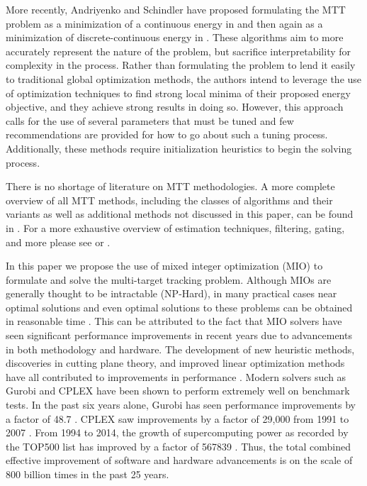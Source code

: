 \documentclass[journal]{IEEEtran}
\begin{document}
More recently, Andriyenko and Schindler have proposed formulating the MTT problem as a minimization of a continuous energy in \cite{Continuous_energy} and then again as a minimization of discrete-continuous energy in \cite{Discrete-Continuous_energy}. These algorithms aim to more accurately represent the nature of the problem, but sacrifice interpretability for complexity in the process. Rather than formulating the problem to lend it easily to traditional global optimization methods, the authors intend to leverage the use of optimization techniques to find strong local minima of their proposed energy objective, and they achieve strong results in doing so. However, this approach calls for the use of several parameters that must be tuned and few recommendations are provided for how to go about such a tuning process. Additionally, these methods require initialization heuristics to begin the solving process. 

There is no shortage of literature on MTT methodologies. A more complete overview of all MTT methods, including the classes of algorithms and their variants as well as additional methods not discussed in this paper, can be found in \cite{MTT-Taxonomy}. For a more exhaustive overview of estimation techniques, filtering, gating, and more please see \cite{Bar-Shalom_MTT} or \cite{Bar-Shalom_Estimation}.

In this paper we propose the use of mixed integer optimization (MIO) to formulate and solve the multi-target tracking problem. Although MIOs are generally thought to be intractable (NP-Hard), in many practical cases near optimal solutions and even optimal solutions to these problems can be obtained in reasonable time \cite{Computation}. This can be attributed to the fact that MIO solvers have seen significant performance improvements in recent years due to advancements in both methodology and hardware. The development of new heuristic methods, discoveries in cutting plane theory, and improved linear optimization methods have all contributed to improvements in performance \cite{Gurobi-MIP}. Modern solvers such as Gurobi and CPLEX have been shown to perform extremely well on benchmark tests. In the past six years alone, Gurobi has seen performance improvements by a factor of 48.7 \cite{Gurobi-Benchmark}. CPLEX saw improvements by a factor of 29,000 from 1991 to 2007 \cite{CPLEX-Benchmark}. From 1994 to 2014, the growth of supercomputing power as recorded by the TOP500 list has improved by a factor of 567839 \cite{Supercomputer}. Thus, the total combined effective improvement of software and hardware advancements is on the scale of 800 billion times in the past 25 years. 
\end{document}
